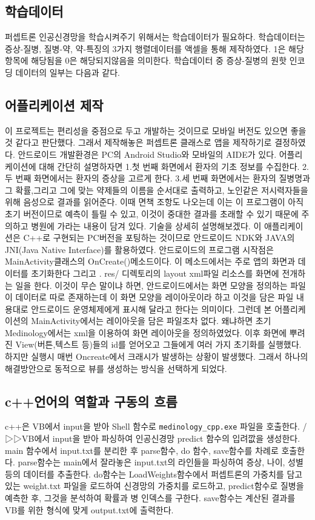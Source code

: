 \documentclass{report}
\begin{document}
\subsection{학습데이터}
퍼셉트론 인공신경망을 학습시켜주기 위해서는 학습데이터가 필요하다. 학습데이터는 증상-질병, 질병-약, 약-특징의 3가지 행렬데이터를 액셀을 통해 제작하였다. 1은 해당항목에 해당됨을 0은 해당되지않음을 의미한다. 학습데이터 중 증상-질병의 원핫 인코딩 데이터의 일부는 다음과 같다.


\subsection{어플리케이션 제작}
이 프로젝트는 편리성을 중점으로 두고 개발하는 것이므로 모바일 버전도 있으면 좋을것 같다고 판단했다. 그래서 제작해놓은 퍼셉트론 클래스로 앱을 제작하기로 결정하였다.
안드로이드 개발환경은 PC의 Android Studio와 모바일의 AIDE가 있다. 어플리케이션에 대해 간단히 설명하자면
1.첫 번째 화면에서 환자의 기초 정보를 수집한다.
2.두 번째 화면에서는 환자의 증상을 고르게 한다.
3.세 번째 화면에서는 환자의 질병명과 그 확률,그리고 그에 맞는 약제들의 이름을 순서대로 출력하고, 노인같은 저시력자들을 위해 음성으로 결과를 읽어준다.
이때 면책 조항도 나오는데 이는 이 프로그램이 아직 초기 버전이므로 예측이 틀릴 수 있고, 이것이 중대한 결과를 초래할 수 있기 때문에 주의하고 병원에 가라는 내용이 담겨 있다.
기술을 상세히 설명해보겠다. 이 애플리케이션은 C++로 구현되는 PC버전을 포팅하는 것이므로 안드로이드 NDK와 JAVA의 JNI(Java Native Interface)를 활용하였다.
안드로이드의 프로그램 시작점은 MainActivity클래스의 OnCreate()메소드이다. 이 메소드에서는 주로 앱의 화면과 데이터를 초기화한다 그리고 . res/ 디렉토리의 layout xml파일 리소스를 화면에 전개하는 일을 한다. 이것이 무슨 말이냐 하면, 안드로이드에서는 화면 모양을 정의하는 파일이 데이터로 따로 존재하는데 이 화면 모양을 레이아웃이라 하고 이것을 담은 파일 내용대로 안드로이드 운영체제에게 표시해 달라고 한다는 의미이다. 그런데 본 어플리케이션의 MainActivity에서는 레이아웃을 담은 파일조차 없다. 왜냐하면 초기 Medinology에서는 xml을 이용하여 화면 레이아웃을 정의하였었다. 이후 화면에 뿌려진 View(버튼,텍스트 등)들의 id를 얻어오고 그들에게 여러 가지 초기화를 실행했다. 하지만  실행시 매번 Oncreate에서 크래시가 발생하는 상황이 발생했다. 그래서 하나의 해결방안으로 동적으로 뷰를 생성하는 방식을 선택하게 되었다.

\subsection{c++언어의 역할과 구동의 흐름}
c++은 VB에서 input을 받아 Shell 함수로 \lstinline{medinology_cpp.exe} 파일을 호출한다.
/▷▷VB에서 input을 받아 파싱하여 인공신경망 predict 함수의 입려깞을  생성한다.
main 함수에서 input.txt를 분리한 후 parse함수, do 함수, save함수를 차례로 호출한다.
parse함수는 main에서 잘라놓은 input.txt의 라인들을 파싱하여 증상, 나이, 성별 등의 데이터를 추출한다.
do함수는 LoadWeights함수에서 퍼셉트론의 가중치를 담고 있는 weight.txt 파일을 로드하여 신경망의 가중치를 로드하고, predict함수로 질병을 예측한 후, 그것을 분석하여 확률과 병 인덱스를 구한다.
save함수는 계산된 결과를 VB를 위한 형식에 맞게 output.txt에 출력한다.
\end{document}

